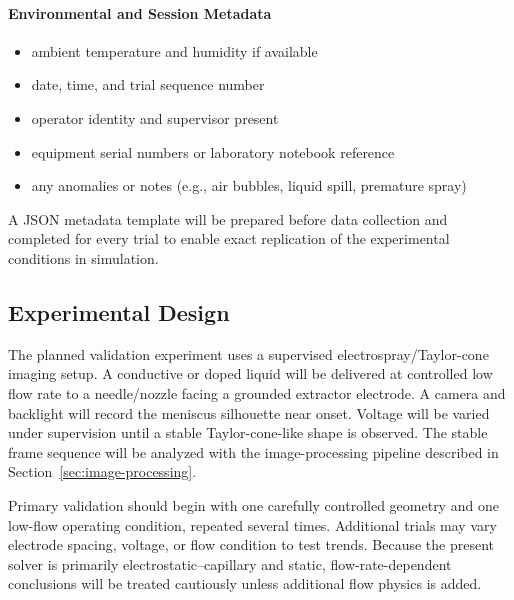 \paragraph{Environmental and Session Metadata}
\begin{itemize}
    \item ambient temperature and humidity if available
    \item date, time, and trial sequence number
    \item operator identity and supervisor present
    \item equipment serial numbers or laboratory notebook reference
    \item any anomalies or notes (e.g., air bubbles, liquid spill, premature spray)
\end{itemize}

A JSON metadata template will be prepared before data collection and completed for every trial to enable exact replication of the experimental conditions in simulation.

\subsection{Experimental Design}

The planned validation experiment uses a supervised electrospray/Taylor-cone imaging setup. A conductive or doped liquid will be delivered at controlled low flow rate to a needle/nozzle facing a grounded extractor electrode. A camera and backlight will record the meniscus silhouette near onset. Voltage will be varied under supervision until a stable Taylor-cone-like shape is observed. The stable frame sequence will be analyzed with the image-processing pipeline described in Section~\ref{sec:image-processing}.

Primary validation should begin with one carefully controlled geometry and one low-flow operating condition, repeated several times. Additional trials may vary electrode spacing, voltage, or flow condition to test trends. Because the present solver is primarily electrostatic--capillary and static, flow-rate-dependent conclusions will be treated cautiously unless additional flow physics is added.

